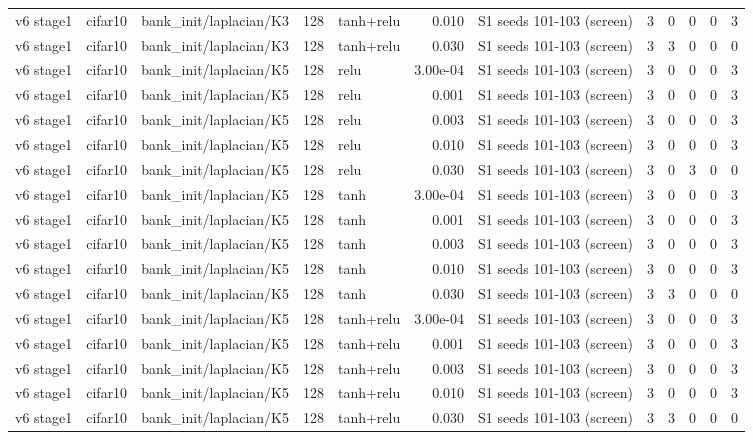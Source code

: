 \begin{table}[htbp]
{\begin{tabular}{@{}lllrlrlrrrrr@{}}
v6 stage1 & cifar10 & bank\_init/laplacian/K3 & 128 & tanh+relu & 0.010 & S1 seeds 101-103 (screen) & 3 & 0 & 0 & 0 & 3 \\
v6 stage1 & cifar10 & bank\_init/laplacian/K3 & 128 & tanh+relu & 0.030 & S1 seeds 101-103 (screen) & 3 & 3 & 0 & 0 & 0 \\
v6 stage1 & cifar10 & bank\_init/laplacian/K5 & 128 & relu & 3.00e-04 & S1 seeds 101-103 (screen) & 3 & 0 & 0 & 0 & 3 \\
v6 stage1 & cifar10 & bank\_init/laplacian/K5 & 128 & relu & 0.001 & S1 seeds 101-103 (screen) & 3 & 0 & 0 & 0 & 3 \\
v6 stage1 & cifar10 & bank\_init/laplacian/K5 & 128 & relu & 0.003 & S1 seeds 101-103 (screen) & 3 & 0 & 0 & 0 & 3 \\
v6 stage1 & cifar10 & bank\_init/laplacian/K5 & 128 & relu & 0.010 & S1 seeds 101-103 (screen) & 3 & 0 & 0 & 0 & 3 \\
v6 stage1 & cifar10 & bank\_init/laplacian/K5 & 128 & relu & 0.030 & S1 seeds 101-103 (screen) & 3 & 0 & 3 & 0 & 0 \\
v6 stage1 & cifar10 & bank\_init/laplacian/K5 & 128 & tanh & 3.00e-04 & S1 seeds 101-103 (screen) & 3 & 0 & 0 & 0 & 3 \\
v6 stage1 & cifar10 & bank\_init/laplacian/K5 & 128 & tanh & 0.001 & S1 seeds 101-103 (screen) & 3 & 0 & 0 & 0 & 3 \\
v6 stage1 & cifar10 & bank\_init/laplacian/K5 & 128 & tanh & 0.003 & S1 seeds 101-103 (screen) & 3 & 0 & 0 & 0 & 3 \\
v6 stage1 & cifar10 & bank\_init/laplacian/K5 & 128 & tanh & 0.010 & S1 seeds 101-103 (screen) & 3 & 0 & 0 & 0 & 3 \\
v6 stage1 & cifar10 & bank\_init/laplacian/K5 & 128 & tanh & 0.030 & S1 seeds 101-103 (screen) & 3 & 3 & 0 & 0 & 0 \\
v6 stage1 & cifar10 & bank\_init/laplacian/K5 & 128 & tanh+relu & 3.00e-04 & S1 seeds 101-103 (screen) & 3 & 0 & 0 & 0 & 3 \\
v6 stage1 & cifar10 & bank\_init/laplacian/K5 & 128 & tanh+relu & 0.001 & S1 seeds 101-103 (screen) & 3 & 0 & 0 & 0 & 3 \\
v6 stage1 & cifar10 & bank\_init/laplacian/K5 & 128 & tanh+relu & 0.003 & S1 seeds 101-103 (screen) & 3 & 0 & 0 & 0 & 3 \\
v6 stage1 & cifar10 & bank\_init/laplacian/K5 & 128 & tanh+relu & 0.010 & S1 seeds 101-103 (screen) & 3 & 0 & 0 & 0 & 3 \\
v6 stage1 & cifar10 & bank\_init/laplacian/K5 & 128 & tanh+relu & 0.030 & S1 seeds 101-103 (screen) & 3 & 3 & 0 & 0 & 0 \\

\end{tabular}}
\end{table}
